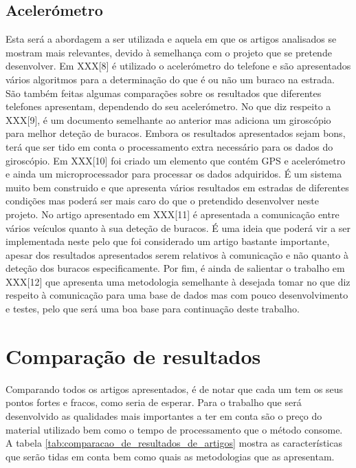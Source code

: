 \subsection{Acelerómetro}
\label{subsec: acelerometro}
Esta será a abordagem a ser utilizada e aquela em que os artigos analisados se mostram mais relevantes, devido à semelhança com o projeto que se pretende desenvolver. Em {XXX}[8] é utilizado o acelerómetro do telefone e são apresentados vários algoritmos para a determinação do que é ou não um buraco na estrada. São também feitas algumas comparações sobre os resultados que diferentes telefones apresentam, dependendo do seu acelerómetro. No que diz respeito a {XXX}[9], é um documento semelhante ao anterior mas adiciona um giroscópio para melhor deteção de buracos. Embora os resultados apresentados sejam bons, terá que ser tido em conta o processamento extra necessário para os dados do giroscópio. Em {XXX}[10] foi criado um elemento que contém GPS e acelerómetro e ainda um microprocessador para processar os dados adquiridos. É um sistema muito bem construido e que apresenta vários resultados em estradas de diferentes condições mas poderá ser mais caro do que o pretendido desenvolver neste projeto. No artigo apresentado em {XXX}[11] é apresentada a comunicação entre vários veículos quanto à sua deteção de buracos. É uma ideia que poderá vir a ser implementada neste pelo que foi considerado um artigo bastante importante, apesar dos resultados apresentados serem relativos à comunicação e não quanto à deteção dos buracos especificamente. Por fim, é ainda de salientar o trabalho em {XXX}[12] que apresenta uma metodologia semelhante à desejada tomar no que diz respeito à comunicação para uma base de dados mas com pouco desenvolvimento e testes, pelo que será uma boa base para continuação deste trabalho.

\section{Comparação de resultados} %
\label{sec:comapracao_de_resultados}

Comparando todos os artigos apresentados, é de notar que cada um tem os seus pontos fortes e fracos, como seria de esperar. Para o trabalho que será desenvolvido as qualidades mais importantes a ter em conta são o preço do material utilizado bem como o tempo de processamento que o método consome. A tabela \ref{tab:comparacao_de_resultados_de_artigos} mostra as características que serão tidas em conta bem como quais as metodologias que as apresentam.


